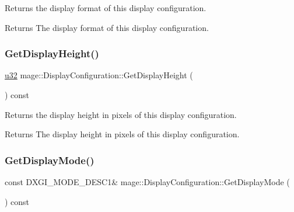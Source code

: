 Returns the display format of this display configuration.

\begin{DoxyReturn}{Returns}
The display format of this display configuration. 
\end{DoxyReturn}
\hypertarget{structmage_1_1_display_configuration_a8a3378659c6da249668416951fff87fe}{}\label{structmage_1_1_display_configuration_a8a3378659c6da249668416951fff87fe} 
\subsubsection{\texorpdfstring{Get\+Display\+Height()}{GetDisplayHeight()}}
{\footnotesize\ttfamily \hyperlink{namespacemage_af2b398bf98eb10351f49cad73fe2cc73}{u32} mage\+::\+Display\+Configuration\+::\+Get\+Display\+Height (\begin{DoxyParamCaption}{ }\end{DoxyParamCaption}) const\hspace{0.3cm}{\ttfamily [noexcept]}}

Returns the display height in pixels of this display configuration.

\begin{DoxyReturn}{Returns}
The display height in pixels of this display configuration. 
\end{DoxyReturn}
\hypertarget{structmage_1_1_display_configuration_a20270be6a17deab929fce25596edabd4}{}\label{structmage_1_1_display_configuration_a20270be6a17deab929fce25596edabd4} 
\subsubsection{\texorpdfstring{Get\+Display\+Mode()}{GetDisplayMode()}}
{\footnotesize\ttfamily const D\+X\+G\+I\+\_\+\+M\+O\+D\+E\+\_\+\+D\+E\+S\+C1\& mage\+::\+Display\+Configuration\+::\+Get\+Display\+Mode (\begin{DoxyParamCaption}{ }\end{DoxyParamCaption}) const\hspace{0.3cm}{\ttfamily [noexcept]}}

